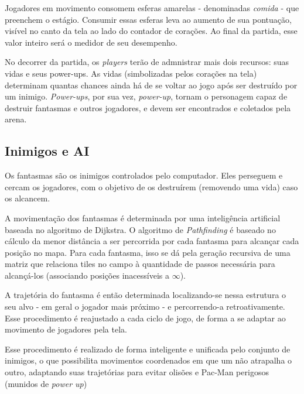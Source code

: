 \documentclass[12pt, a4paper, twocolumn]{article}
\begin{document}
Jogadores em movimento consomem esferas amarelas - denominadas \textit{comida} - que preenchem o estágio. Consumir essas esferas leva ao aumento de sua pontuação, visível no canto da tela ao lado do contador de corações. Ao final da partida, esse valor inteiro será o medidor de seu desempenho.

No decorrer da partida, os \textit{players} terão de admnistrar mais dois recursos: suas vidas e seus power-ups. As vidas (simbolizadas pelos corações na tela) determinam quantas chances ainda há de se voltar ao jogo após ser destruído por um inimigo. \textit{Power-ups}, por sua vez, \textit{power-up}, tornam o personagem capaz de destruir fantasmas e outros jogadores, e devem ser encontrados e coletados pela arena.



\subsection{Inimigos e AI}

Os fantasmas são os inimigos controlados pelo computador. Eles perseguem e cercam os jogadores, com o objetivo de os destruírem (removendo uma vida) caso os alcancem. 

A movimentação dos fantasmas é determinada por uma inteligência artificial baseada no algoritmo de Dijkstra. O algoritmo de \textit{Pathfinding} é baseado no cálculo da menor distância a ser percorrida por cada fantasma para alcançar cada posição no mapa. Para cada fantasma, isso se dá pela geração recursiva de uma matriz que relaciona tiles no campo à quantidade de passos necessária para alcançá-los (associando  posições inacessíveis a $\infty$).

A trajetória do fantasma é então determinada localizando-se nessa estrutura o seu alvo - em geral o jogador mais próximo - e percorrendo-a retroativamente. Esse procedimento é reajustado a cada ciclo de jogo, de forma a se adaptar ao movimento de jogadores pela tela.

Esse procedimento é realizado de forma inteligente e unificada pelo conjunto de inimigos, o que possibilita movimentos coordenados em que um não atrapalha o outro, adaptando suas trajetórias para evitar olisões e Pac-Man perigosos (munidos de \textit{power up})

\end{document}
